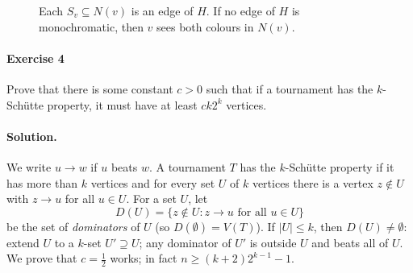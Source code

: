 \documentclass[a4paper,12pt]{article}
\begin{document}
\begin{figure}[ht]
\centering
{}
\caption{Each $S_v \subseteq N(v)$ is an edge of $H$. If no edge of $H$ is monochromatic, then $v$ sees both colours in $N(v)$.}
\label{fig:ex3}
\end{figure}

\paragraph{Exercise 4}  Prove that there is some constant $c > 0$ such that if a tournament has the $k$-Sch\"utte property, it must have at least $c k 2^k$ vertices.

\paragraph{Solution.} We write $u \to w$ if $u$ beats $w$. A tournament $T$ has the $k$-Sch\"utte property if it has more than $k$ vertices and for every set $U$ of $k$ vertices there is a vertex $z \notin U$ with $z \to u$ for all $u \in U$. For a set $U$, let
\[
	D(U) = \{ z \notin U : z \to u \text{ for all } u \in U \}
\]
be the set of \emph{dominators} of $U$ (so $D(\emptyset) = V(T)$). If $|U| \le k$, then $D(U) \ne \emptyset$: extend $U$ to a $k$-set $U' \supseteq U$; any dominator of $U'$ is outside $U$ and beats all of $U$. We prove that $c = \frac12$ works; in fact $n \ge (k+2) 2^{k-1} - 1$.
\end{document}
